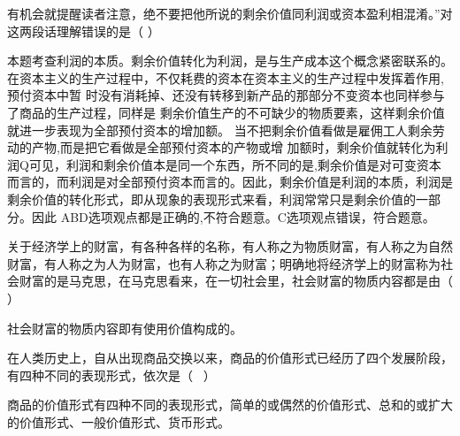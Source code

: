 有机会就提醒读者注意，绝不要把他所说的剩余价值同利润或资本盈利相混淆。''对这两段话理解错误的是（
）
\par{}
\begin{solution}本题考查利润的本质。剩余价值转化为利润，是与生产成本这个概念紧密联系的。在资本主义的生产过程中，不仅耗费的资本在资本主义的生产过程中发挥着作用,预付资本中暂
时没有消耗掉、还没有转移到新产品的那部分不变资本也同样参与了商品的生产过程，同样是
剩余价值生产的不可缺少的物质要素，这样剩余价值就进一步表现为全部预付资本的增加额。
当不把剩余价值看做是雇佣工人剩余劳动的产物,而是把它看做是全部预付资本的产物或增
加额时，剩余价值就转化为利润Q可见，利润和剩余价值本是同一个东西，所不同的是,剩余价值是对可变资本而言的，而利润是对全部预付资本而言的。因此，剩余价值是利润的本质，利润是剩余价值的转化形式，即从现象的表现形式来看，利润常常只是剩余价值的一部分。因此
ABD选项观点都是正确的,不符合题意。C选项观点错误，符合题意。
\end{solution}
\question 关于经济学上的财富，有各种各样的名称，有人称之为物质财富，有人称之为自然财富，有人称之为人为财富，也有人称之为财富；明确地将经济学上的财富称为社会财富的是马克思，在马克思看来，在一切社会里，社会财富的物质内容都是由（
）
\par{}
\begin{solution}社会财富的物质内容即有使用价值构成的。
\end{solution}
\question 在人类历史上，自从出现商品交换以来，商品的价值形式已经历了四个发展阶段，有四种不同的表现形式，依次是（
~）
\par{}
\begin{solution}商品的价值形式有四种不同的表现形式，简单的或偶然的价值形式、总和的或扩大的价值形式、一般价值形式、货币形式。
\end{solution}
